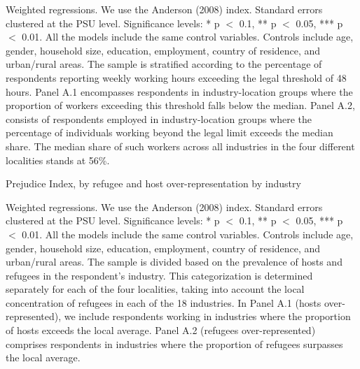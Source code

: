 \documentclass[a4paper,12pt]{article}
\renewcommand{\footnotesize}{\fontsize{8pt}{9pt}\selectfont}
\begin{document}
\begin{appendix}
\begin{table}[H]
\begin{threeparttable}
\begin{tablenotes}
	\footnotesize
	\item Weighted regressions. We use the Anderson (2008) index. Standard errors clustered at the PSU level. Significance levels: * p $<$ 0.1, ** p $<$ 0.05, *** p $<$ 0.01. All the models include the same control variables. Controls include age, gender, household size, education, employment, country of residence, and urban/rural areas. The sample is stratified according to the percentage of respondents reporting weekly working hours exceeding the legal threshold of 48 hours. Panel A.1 encompasses respondents in industry-location groups where the proportion of workers exceeding this threshold falls below the median. Panel A.2,  consists of respondents employed in industry-location groups where the percentage of individuals working beyond the legal limit exceeds the median share. The median share of such workers across all industries in the four different localities stands at 56\%.
\end{tablenotes}
\end{threeparttable}
\end{table} 
\vspace{8mm}


\begin{table}[H]
	\footnotesize
	\caption{Prejudice Index, by refugee and host over-representation by industry}
	\label{tab:het_repres}
	\centering
	\begin{threeparttable}
		\centering
		
\begin{tablenotes}
	\footnotesize
	\item Weighted regressions. We use the Anderson (2008) index. Standard errors clustered at the PSU level. Significance levels: * p $<$ 0.1, ** p $<$ 0.05, *** p $<$ 0.01. All the models include the same control variables. Controls include age, gender, household size, education, employment, country of residence, and urban/rural areas. The sample is divided based on the prevalence of hosts and refugees in the respondent's industry. This categorization is determined separately for each of the four localities, taking into account the local concentration of refugees in each of the 18 industries. In Panel A.1 (hosts over-represented), we include respondents working in industries where the proportion of hosts exceeds the local average. Panel A.2 (refugees over-represented) comprises respondents in industries where the proportion of refugees surpasses the local average.
\end{tablenotes}
\end{threeparttable}
\end{table} 
\vspace{8mm}


\end{appendix}
\end{document}
